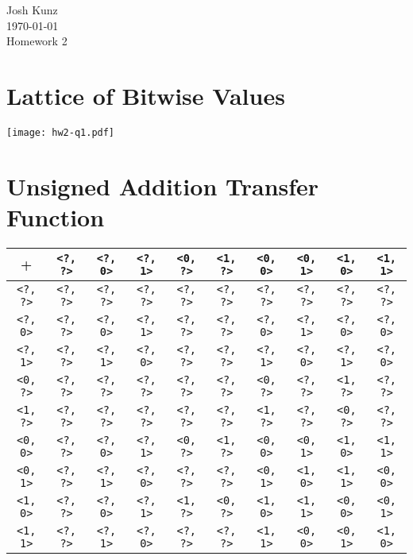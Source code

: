 \documentclass[12pt]{article}
\begin{document}
\begin{flushright}
Josh Kunz \\
\today \\
Homework 2 \\
\end{flushright}

\section{Lattice of Bitwise Values}
\vspace{-2ex}

\begin{center}
\texttt{[image: hw2-q1.pdf]}
\end{center}

\section{Unsigned Addition Transfer Function}
\vspace{-2ex}
\begin{center}
\begin{tabular}{c|ccccccccc}
+      & \verb|<?, ?>| & \verb|<?, 0>| & \verb|<?, 1>| & \verb|<0, ?>| & \verb|<1, ?>| & \verb|<0, 0>| & \verb|<0, 1>| & \verb|<1, 0>| & \verb|<1, 1>| \\
\hline
\verb|<?, ?>| & \verb|<?, ?>| & \verb|<?, ?>| & \verb|<?, ?>| & \verb|<?, ?>| & \verb|<?, ?>| & \verb|<?, ?>| & \verb|<?, ?>| & \verb|<?, ?>| & \verb|<?, ?>| \\
\verb|<?, 0>| & \verb|<?, ?>| & \verb|<?, 0>| & \verb|<?, 1>| & \verb|<?, ?>| & \verb|<?, ?>| & \verb|<?, 0>| & \verb|<?, 1>| & \verb|<?, 0>| & \verb|<?, 0>| \\
\verb|<?, 1>| & \verb|<?, ?>| & \verb|<?, 1>| & \verb|<?, 0>| & \verb|<?, ?>| & \verb|<?, ?>| & \verb|<?, 1>| & \verb|<?, 0>| & \verb|<?, 1>| & \verb|<?, 0>| \\
\verb|<0, ?>| & \verb|<?, ?>| & \verb|<?, ?>| & \verb|<?, ?>| & \verb|<?, ?>| & \verb|<?, ?>| & \verb|<0, ?>| & \verb|<?, ?>| & \verb|<1, ?>| & \verb|<?, ?>| \\
\verb|<1, ?>| & \verb|<?, ?>| & \verb|<?, ?>| & \verb|<?, ?>| & \verb|<?, ?>| & \verb|<?, ?>| & \verb|<1, ?>| & \verb|<?, ?>| & \verb|<0, ?>| & \verb|<?, ?>| \\
\verb|<0, 0>| & \verb|<?, ?>| & \verb|<?, 0>| & \verb|<?, 1>| & \verb|<0, ?>| & \verb|<1, ?>| & \verb|<0, 0>| & \verb|<0, 1>| & \verb|<1, 0>| & \verb|<1, 1>| \\
\verb|<0, 1>| & \verb|<?, ?>| & \verb|<?, 1>| & \verb|<?, 0>| & \verb|<?, ?>| & \verb|<?, ?>| & \verb|<0, 1>| & \verb|<1, 0>| & \verb|<1, 1>| & \verb|<0, 0>| \\
\verb|<1, 0>| & \verb|<?, ?>| & \verb|<?, 0>| & \verb|<?, 1>| & \verb|<1, ?>| & \verb|<0, ?>| & \verb|<1, 0>| & \verb|<1, 1>| & \verb|<0, 0>| & \verb|<0, 1>| \\
\verb|<1, 1>| & \verb|<?, ?>| & \verb|<?, 1>| & \verb|<?, 0>| & \verb|<?, ?>| & \verb|<?, ?>| & \verb|<1, 1>| & \verb|<0, 0>| & \verb|<0, 1>| & \verb|<1, 0>| \\
\end{tabular}
\end{center}
\end{document}
